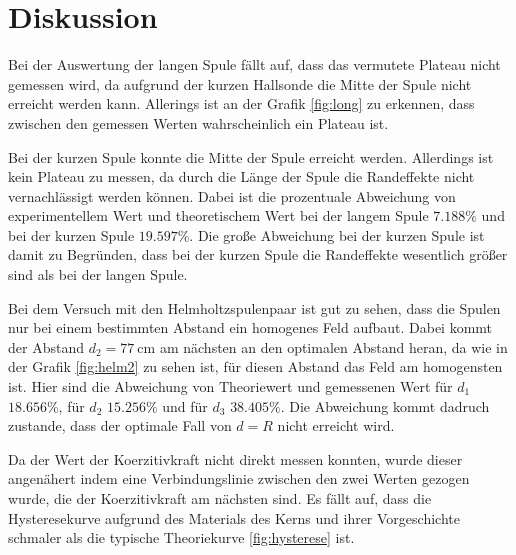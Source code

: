 \section{Diskussion}
\label{sec:Diskussion}

Bei der Auswertung der langen Spule fällt auf, dass das vermutete Plateau nicht gemessen wird, da aufgrund der kurzen Hallsonde die Mitte der Spule nicht erreicht werden kann.
Allerings ist an der Grafik \ref{fig:long} zu erkennen, dass zwischen den gemessen Werten wahrscheinlich ein Plateau ist.

Bei der kurzen Spule konnte die Mitte der Spule erreicht werden. 
Allerdings ist kein Plateau zu messen, da durch die Länge der Spule die Randeffekte nicht vernachlässigt werden können.
Dabei ist die prozentuale Abweichung von experimentellem Wert und theoretischem Wert bei der langem Spule $7.188\%$ und bei der kurzen Spule $19.597\%$.
Die große Abweichung bei der kurzen Spule ist damit zu Begründen, dass bei der kurzen Spule die Randeffekte wesentlich größer sind als bei der langen Spule.

Bei dem Versuch mit den Helmholtzspulenpaar ist gut zu sehen, dass die Spulen nur bei einem bestimmten Abstand ein homogenes Feld aufbaut.
Dabei kommt der Abstand $d_2=7\SI{7}{\centi\meter}$ am nächsten an den optimalen Abstand heran, da wie in der Grafik \ref{fig:helm2} zu sehen ist, für diesen Abstand das Feld am homogensten ist.
Hier sind die Abweichung von Theoriewert und gemessenen Wert für $d_1$ $18.656\%$, für $d_2$ $15.256 \%$ und für $d_3$ $38.405 \%$.
Die Abweichung kommt dadruch zustande, dass der optimale Fall von $d=R$ nicht erreicht wird.

Da der Wert der Koerzitivkraft nicht direkt messen konnten, wurde dieser angenähert indem eine Verbindungslinie zwischen den zwei Werten gezogen wurde, die der Koerzitivkraft am nächsten sind.
Es fällt auf, dass die Hysteresekurve aufgrund des Materials des Kerns und ihrer Vorgeschichte schmaler als die typische Theoriekurve \ref{fig:hysterese} ist.